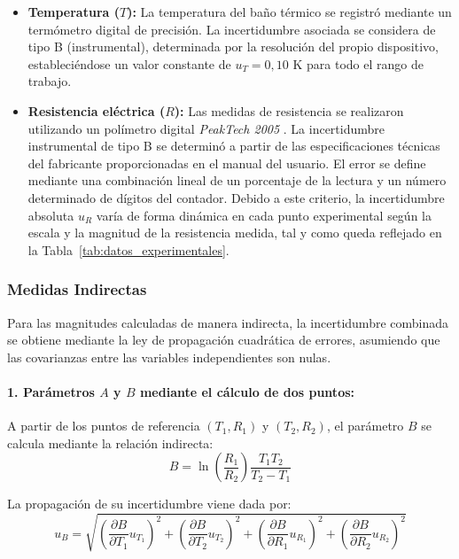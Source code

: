 \documentclass[11pt,a4paper]{article}
\begin{document}
\begin{itemize}
    \item \textbf{Temperatura ($T$):} La temperatura del baño térmico se registró mediante un termómetro digital de precisión. La incertidumbre asociada se considera de tipo B (instrumental), determinada por la resolución del propio dispositivo, estableciéndose un valor constante de $u_T = 0,10\text{ K}$ para todo el rango de trabajo.
    
    \item \textbf{Resistencia eléctrica ($R$):} Las medidas de resistencia se realizaron utilizando un polímetro digital \textit{PeakTech 2005} \cite{manual_peaktech}. La incertidumbre instrumental de tipo B se determinó a partir de las especificaciones técnicas del fabricante proporcionadas en el manual del usuario. El error se define mediante una combinación lineal de un porcentaje de la lectura y un número determinado de dígitos del contador. Debido a este criterio, la incertidumbre absoluta $u_R$ varía de forma dinámica en cada punto experimental según la escala y la magnitud de la resistencia medida, tal y como queda reflejado en la Tabla~\ref{tab:datos_experimentales}.
\end{itemize}

\subsubsection{Medidas Indirectas}

Para las magnitudes calculadas de manera indirecta, la incertidumbre combinada se obtiene mediante la ley de propagación cuadrática de errores, asumiendo que las covarianzas entre las variables independientes son nulas.

\paragraph{1. Parámetros $A$ y $B$ mediante el cálculo de dos puntos:}
A partir de los puntos de referencia $(T_1, R_1)$ y $(T_2, R_2)$, el parámetro $B$ se calcula mediante la relación indirecta:
\begin{equation}
B = \ln\left(\frac{R_1}{R_2}\right) \frac{T_1 T_2}{T_2 - T_1}
\end{equation}

La propagación de su incertidumbre viene dada por:
\begin{equation}
u_B = \sqrt{\left(\frac{\partial B}{\partial T_1} u_{T_1}\right)^2 + \left(\frac{\partial B}{\partial T_2} u_{T_2}\right)^2 + \left(\frac{\partial B}{\partial R_1} u_{R_1}\right)^2 + \left(\frac{\partial B}{\partial R_2} u_{R_2}\right)^2}
\end{equation}
\end{document}
